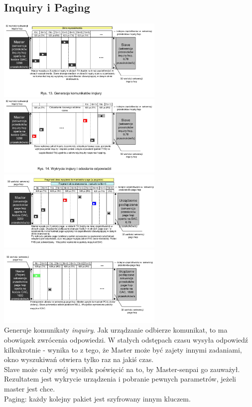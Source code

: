 \subsection{Inquiry i Paging}
\includegraphics[width=8cm]{./wyklady/Rysunek06.pdf}
\includegraphics[width=8cm]{./wyklady/Rysunek07.pdf}\\
\includegraphics[width=8cm]{./wyklady/Rysunek08.pdf}
\includegraphics[width=8cm]{./wyklady/Rysunek09.pdf}\\
Generuje komunikaty \emph{inquiry}.
Jak urządzanie odbierze komunikat, to ma obowiązek zwrócenia odpowiedzi. W stałych odstępach czasu wysyła odpowiedź kilkukrotnie - wynika to z tego, że Master może być zajety innymi zadaniami, okno wyszukiwań otwiera tylko raz na jakiś czas.\\
Slave może cały swój wysiłek poświęcić na to, by Master-senpai go zauważył. \\

Rezultatem jest wykrycie urządzenia i pobranie pewnych parametrów, jeżeli master jest chce.\\

Paging: każdy kolejny pakiet jest szyfrowany innym kluczem.